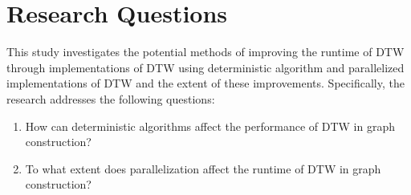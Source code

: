 \section{Research Questions}

This study investigates the potential methods of improving the runtime of DTW through implementations of DTW using deterministic algorithm and parallelized implementations of DTW and the extent of these improvements. Specifically, the research addresses the following questions:
\begin{enumerate}
    \item How can deterministic algorithms affect the performance of DTW in graph construction?
    \item To what extent does parallelization affect the runtime of DTW in graph construction?
\end{enumerate}